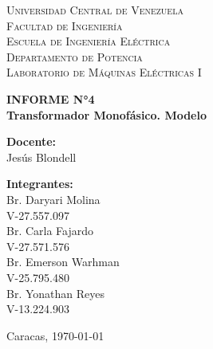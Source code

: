 \begin{titlepage}
    \begin{center}
        \textsc{Universidad Central de Venezuela}\\
        \textsc{Facultad de Ingeniería}\\
        \textsc{Escuela de Ingeniería Eléctrica}\\
        \textsc{Departamento de Potencia}\\
        \textsc{Laboratorio de Máquinas Eléctricas I}
        \vfill
        
        {\Large \bfseries INFORME N°4}\\[0.5cm]
        {\Large \bfseries Transformador Monofásico. Modelo}
        \vfill
        
        \begin{minipage}[t]{0.45\textwidth}
            \begin{flushleft}
                \textbf{Docente:}\\
                Jesús Blondell
            \end{flushleft}
        \end{minipage}%
        \hfill
        \begin{minipage}[t]{0.45\textwidth}
            \begin{flushright}
                \textbf{Integrantes:}\\
                Br. Daryari Molina\\
                V-27.557.097\\
                Br. Carla Fajardo\\
                V-27.571.576\\
                Br. Emerson Warhman\\
                V-25.795.480\\
                Br. Yonathan Reyes\\
                V-13.224.903
            \end{flushright}
        \end{minipage}
        
        \vfill
        
        {Caracas, \today}
    \end{center}
\end{titlepage}